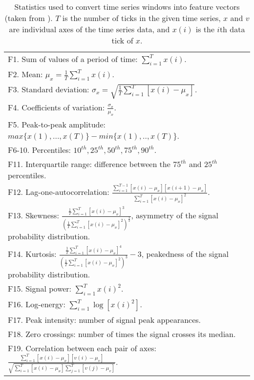 \vspace{1ex}
\begin{table}[H]
\centering
\begin{tabular}{|p{15cm}|}  \hline
F1. Sum of values of a period of time: $\sum^T_{i=1} x(i)$.\\ [2ex]
F2. Mean: $\mu_x = \frac{1}{T} \sum^T_{i=1} x(i)$.\\ [2ex]
F3. Standard deviation: $\sigma_x = \sqrt{\frac{1}{T} \sum^T_{i=1} [x(i) - \mu_x]}$.\\ [2ex]
F4. Coefficients of variation: $\frac{\sigma_x}{\mu_x}$. \\ [2ex]
F5. Peak-to-peak amplitude: $max \{x(1), ..., x(T)\} - min \{x(1), .., x(T)\}$.\\ [2ex]
F6-10. Percentiles: $10^{th}, 25^{th}, 50^{th}, 75^{th}, 90^{th}$.\\ [2ex]
F11. Interquartile range: difference between the $75^{th}$ and $25^{th}$ percentiles.\\ [2ex]
F12. Lag-one-autocorrelation: $\frac{\sum^{T-1}_{i=1} [x(i) - \mu_x][x(i+1) - \mu_x]}{\sum^T_{i=1} [x(i) - \mu_x]^2}$.\\ [2ex]
F13. Skewness:
 $\frac{\frac{1}{T} \sum^T_{i=1} [x(i) - \mu_x]^3}
{(\frac{1}{T} \sum^T_{i=1} [x(i) - \mu_x]^2)^\frac{3}{2}}$,
 asymmetry of the signal probability distribution.\\ [2ex]
F14. Kurtosis:
 $\frac{\frac{1}{T} \sum^T_{i=1} [x(i) - \mu_x]^4}
{(\frac{1}{T} \sum^T_{i=1} [x(i) - \mu_x]^2)^3} - 3$,
 peakedness of the signal probability distribution.\\ [2ex]
F15. Signal power: $\sum^T_{i=1} x(i)^2$.\\ [2ex]
F16. Log-energy: $\sum^T_{i=1} \log[x(i)^2]$.\\ [2ex]
F17. Peak intensity: number of signal peak appearances.\\ [2ex]
F18. Zero crossings: number of times the signal crosses its median.\\ [2ex]
F19. Correlation between each pair of axes:
 $\frac{\sum^T_{i=1}[x(i)-\mu_x][v(i)-\mu_v]}
{\sqrt{\sum^T_{i=1}[x(i)-\mu_x] \sum^T_{j=1}[v(j)-\mu_v]}}$.\\ [2ex] \hline
\end{tabular}
\caption{Statistics used to convert time series windows into feature vectors
(taken from \cite{zheng13}). $T$ is the number of ticks in the given time
series, $x$ and $v$ are individual axes of the time series data, and $x(i)$
is the $i$th data tick of $x$.}
\end{table}


